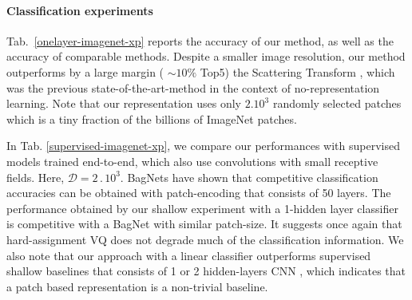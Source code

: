 \documentclass{article} %
\begin{document}
\paragraph{Classification experiments}
Tab.~\ref{onelayer-imagenet-xp} reports the accuracy of our method, as well as the accuracy of comparable methods. Despite a smaller image resolution, our method outperforms by a large margin ( $\sim 10\%$ Top5) the  Scattering Transform \citep{mallat2012group}, which was the previous state-of-the-art-method in the context of no-representation learning.
Note that our representation uses only $2.10^3$ randomly selected patches which is a tiny fraction of the billions of ImageNet patches.


In Tab. \ref{supervised-imagenet-xp}, we compare our performances with supervised models trained end-to-end, which also use convolutions with small receptive fields. Here, $\mathcal{D}=2\,.\,10^3$.
BagNets \citep{brendel2019approximating} have shown that  competitive classification accuracies can be obtained with patch-encoding that consists of 50 layers.
The performance obtained by our shallow experiment with a 1-hidden layer classifier is competitive with a BagNet with similar patch-size.
It suggests once again that hard-assignment VQ does not degrade much of the classification information.
We also note that our approach with a linear classifier outperforms supervised shallow baselines that consists of 1 or 2 hidden-layers CNN \citep{belilovsky2018greedy}, which indicates that a patch based representation is a non-trivial baseline.
\end{document}
